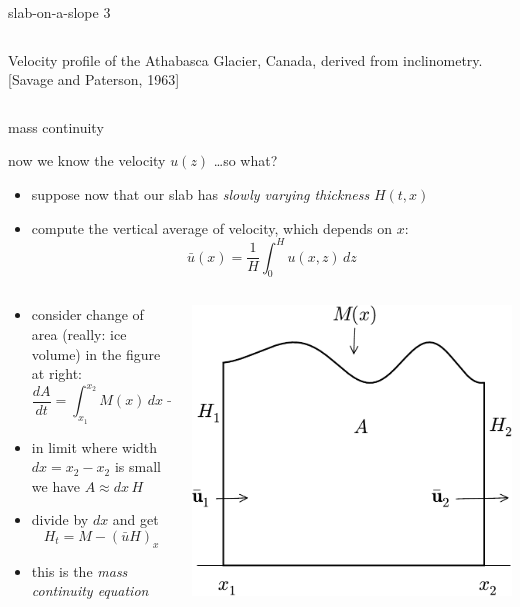\begin{frame}{slab-on-a-slope 3}
\begin{columns}
\begin{column}{0.4\textwidth}
\medskip
\scriptsize
Velocity profile of the Athabasca Glacier, Canada, derived from inclinometry.  [Savage and Paterson, 1963]
\end{column}
\end{columns}
\end{frame}


\begin{frame}{mass continuity}

\small
now we know the velocity $u(z)$ \dots so what?
\begin{itemize}
\item suppose now that our slab has \emph{slowly varying thickness} $H(t,x)$
\item compute the vertical average of velocity, which depends on $x$:
	$$\bar u(x) = \frac{1}{H}\int_0^{H} u(x,z)\,dz$$
\end{itemize}

\begin{columns}
\begin{column}{0.6\textwidth}
\begin{itemize}
\item consider change of area (really: ice volume) in the figure at right:
	$$\frac{dA}{dt} = \int_{x_1}^{x_2} M(x)\,dx + \bar u_1 H_1 - \bar u_2 H_2$$
\item in limit where width $dx=x_2-x_2$ is small we have $A\approx dx\, H$
\item divide by $dx$ and get
   $$H_t = M - \left(\bar u H\right)_x$$
\item this is the \emph{mass continuity equation}
\end{itemize}
\end{column}
\begin{column}{0.4\textwidth}
\includegraphics[width=1.0\textwidth]{photos/slabmasscontfig}
\end{column}
\end{columns}
\end{frame}


